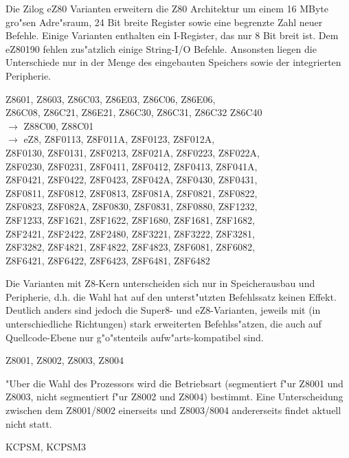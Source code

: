 \documentclass[12pt,a4paper,twoside]{report}
\begin{document}
Die Zilog eZ80 Varianten erweitern die Z80 Architektur um
einem 16 MByte gro"sen Adre"sraum, 24 Bit breite Register
sowie eine begrenzte Zahl neuer Befehle.  Einige Varianten
enthalten ein I-Register, das nur 8 Bit breit ist.  Dem
eZ80190 fehlen zus"atzlich einige String-I/O Befehle.  Ansonsten
liegen die Unterschiede nur in der Menge des eingebauten
Speichers sowie der integrierten Peripherie.
\begin{cpulist}
   Z8601, Z8603, Z86C03, Z86E03, Z86C06, Z86E06, \\
\> Z86C08, Z86C21, Z86E21, Z86C30, Z86C31, Z86C32 Z86C40 \\
\> $\rightarrow$ Z88C00, Z88C01 \\
\> $\rightarrow$ eZ8, Z8F0113, Z8F011A, Z8F0123, Z8F012A, \\
\> Z8F0130, Z8F0131, Z8F0213, Z8F021A, Z8F0223, Z8F022A, \\
\> Z8F0230, Z8F0231, Z8F0411, Z8F0412, Z8F0413, Z8F041A, \\
\> Z8F0421, Z8F0422, Z8F0423, Z8F042A, Z8F0430, Z8F0431, \\
\> Z8F0811, Z8F0812, Z8F0813, Z8F081A, Z8F0821, Z8F0822, \\
\> Z8F0823, Z8F082A, Z8F0830, Z8F0831, Z8F0880, Z8F1232, \\
\> Z8F1233, Z8F1621, Z8F1622, Z8F1680, Z8F1681, Z8F1682, \\
\> Z8F2421, Z8F2422, Z8F2480, Z8F3221, Z8F3222, Z8F3281, \\
\> Z8F3282, Z8F4821, Z8F4822, Z8F4823, Z8F6081, Z8F6082, \\
\> Z8F6421, Z8F6422, Z8F6423, Z8F6481, Z8F6482
\end{cpulist}
Die Varianten mit Z8-Kern unterscheiden sich nur in
Speicherausbau und Peripherie, d.h. die Wahl hat auf den
unterst"utzten Befehlssatz keinen Effekt.  Deutlich anders sind
jedoch die Super8- und eZ8-Varianten, jeweils mit (in unterschiedliche
Richtungen) stark erweiterten Befehlss"atzen, die auch auf Quellcode-Ebene
nur g"o"stenteils aufw"arts-kompatibel sind.
\begin{cpulist}
   Z8001, Z8002, Z8003, Z8004
\end{cpulist}
"Uber die Wahl des Prozessors wird die Betriebsart (segmentiert f"ur
Z8001 und Z8003, nicht segmentiert f"ur Z8002 und Z8004) bestimmt.  Eine
Unterscheidung zwischen dem Z8001/8002 einerseits und Z8003/8004 andererseits
findet aktuell nicht statt.
\begin{cpulist}
   KCPSM, KCPSM3
\end{cpulist}
\end{document}
